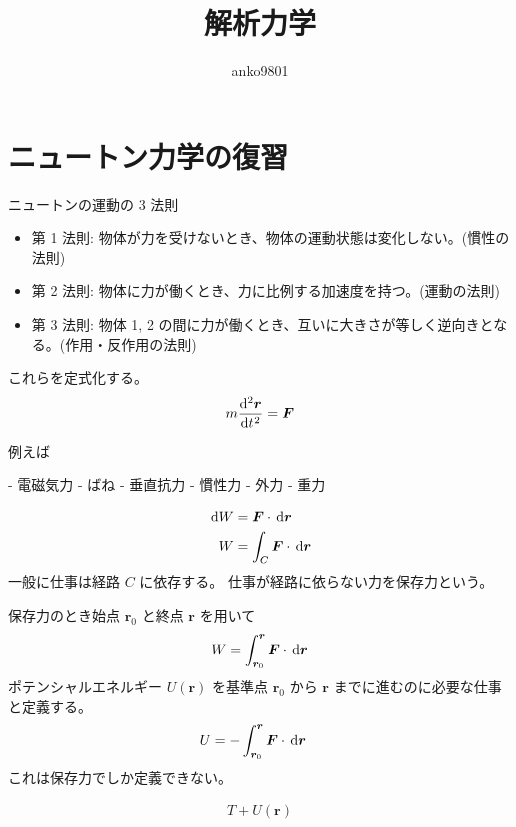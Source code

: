 \documentclass[uplatex,dvipdfmx,a4paper,11pt]{jlreq}
\title{解析力学}
\author{anko9801}
\newcommand{\rr}{\bm{r}}
\numberwithin{equation}{section}
\theoremstyle{definition}
\begin{document}
\maketitle
\tableofcontents
\clearpage

\section{ニュートン力学の復習}
\begin{definition}
  ニュートンの運動の 3 法則
  \begin{itemize}
    \item 第 1 法則: 物体が力を受けないとき、物体の運動状態は変化しない。(慣性の法則)
    \item 第 2 法則: 物体に力が働くとき、力に比例する加速度を持つ。(運動の法則)
    \item 第 3 法則: 物体 1, 2 の間に力が働くとき、互いに大きさが等しく逆向きとなる。(作用・反作用の法則)
  \end{itemize}
\end{definition}
これらを定式化する。
\begin{align}
  m\diff[2]{\rr}{t} = \bm{F}
\end{align}

例えば

- 電磁気力
- ばね
- 垂直抗力
- 慣性力
- 外力
- 重力

\begin{definition}[仕事]
  \begin{align}
    \dl{W} & = \bm{F}\cdot\dl{\rr}        \\
    W      & = \int_C \bm{F}\cdot\dl{\rr}
  \end{align}
  一般に仕事は経路 $C$ に依存する。
  仕事が経路に依らない力を保存力という。
\end{definition}
保存力のとき始点 $\rr_0$ と終点 $\rr$ を用いて
\begin{align}
  W = \int_{\rr_0}^{\rr}\bm{F}\cdot\dl{\rr}
\end{align}
ポテンシャルエネルギー $U(\rr)$ を基準点 $\rr_0$ から $\rr$ までに進むのに必要な仕事と定義する。
\begin{align}
  U & = -\int_{\rr_0}^{\rr}\bm{F}\cdot\dl{\rr}
\end{align}
これは保存力でしか定義できない。

\begin{theorem}[エネルギー保存則]
  \begin{align}
    T + U(\rr)
  \end{align}
\end{theorem}
\end{document}
